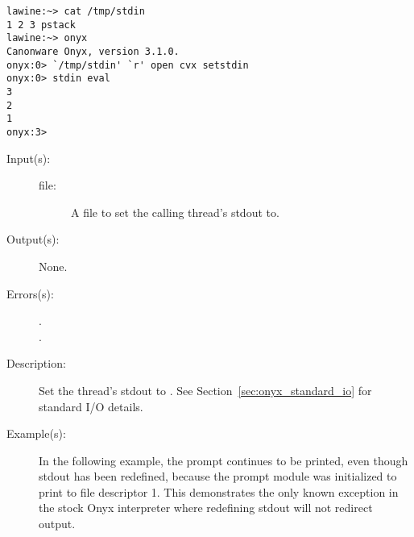 \begin{description}
\begin{description}
\begin{verbatim}
lawine:~> cat /tmp/stdin
1 2 3 pstack
lawine:~> onyx 
Canonware Onyx, version 3.1.0.
onyx:0> `/tmp/stdin' `r' open cvx setstdin
onyx:0> stdin eval
3
2
1
onyx:3>
		\end{verbatim}
	\end{description}
\label{systemdict:setstdout}
\item[{\onyxop{file}{setstdout}{--}}: ]
	\begin{description}\item[]
	\item[Input(s): ]
		\begin{description}\item[]
		\item[file: ]
			A file to set the calling thread's stdout to.
		\end{description}
	\item[Output(s): ] None.
	\item[Errors(s): ]
		\begin{description}\item[]
		\item[.]
		\item[.]
		\end{description}
	\item[Description: ]
		Set the thread's stdout to .  See
		Section~\ref{sec:onyx_standard_io} for standard I/O details.
	\item[Example(s): ]
		In the following example, the prompt continues to be printed,
		even though stdout has been redefined, because the prompt module
		was initialized to print to file descriptor 1.  This
		demonstrates the only known exception in the stock Onyx
		interpreter where redefining stdout will not redirect output.
\begin{verbatim}


\end{verbatim}
\end{description}
\end{description}
